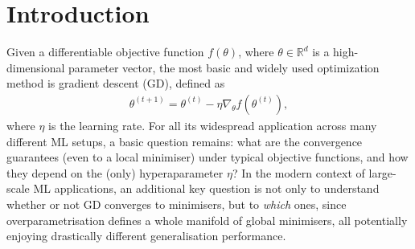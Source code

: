\documentclass{article}
\theoremstyle{plain}
\theoremstyle{remark}
\def\t{^{(t)}}
\def\tt{^{(t+1)}}
\newcommand{\lei}[1]{\noindent{\color{red}{[Lei: #1]}}}
\begin{document}
\begin{abstract}
\end{abstract}



\section{Introduction}

Given a differentiable objective function $f(\theta)$, where $\theta \in \mathbb{R}^d$ is a high-dimensional parameter vector, the most basic and widely used optimization method is gradient descent (GD), defined as 
\begin{align}
\label{eq:GD}
    \theta\tt = \theta\t - \eta \nabla_\theta f(\theta\t),
\end{align}
where $\eta$ is the learning rate. For all its widespread application across many different ML setups, a basic question remains: what are the convergence guarantees (even to a local minimiser) under typical objective functions, and how they depend on the (only) hyperaparameter $\eta$?
In the modern context of large-scale ML applications, an additional key question is not only to understand whether or not GD converges to minimisers, but to \emph{which} ones, since overparametrisation defines a whole manifold of global minimisers, all potentially enjoying drastically different generalisation performance. 
\end{document}
